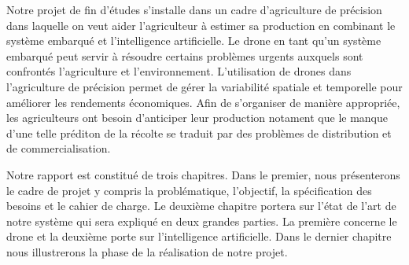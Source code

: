 Notre projet de fin d'études s'installe dans un cadre d'agriculture de précision dans laquelle on veut aider l'agriculteur à estimer sa production en combinant le système embarqué et l'intelligence artificielle. Le drone en tant qu'un système embarqué peut servir à résoudre certains problèmes urgents auxquels sont confrontés l'agriculture et l'environnement. L'utilisation de drones dans l'agriculture de précision permet de gérer la variabilité spatiale et temporelle pour améliorer les rendements économiques. Afin de s'organiser de manière appropriée, les agriculteurs ont besoin d'anticiper leur production notament que le manque d'une telle préditon de la récolte se traduit par des problèmes de distribution et de commercialisation.


Notre rapport est constitué de trois chapitres. Dans le premier, nous présenterons le cadre de projet y compris la problématique, l'objectif, la spécification des besoins et le cahier de charge. Le deuxième chapitre portera sur l'état de l'art de notre système qui sera expliqué en deux grandes parties. La première concerne le drone et la deuxième porte sur l'intelligence artificielle. Dans le dernier chapitre nous illustrerons la phase de la réalisation de notre projet.
